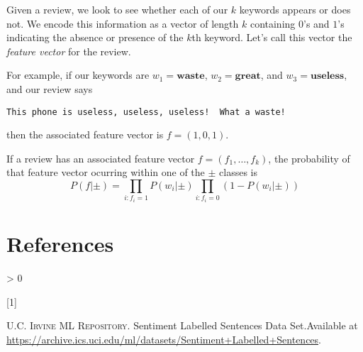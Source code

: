 \documentclass[
]{article}
\newlength{\cslhangindent}
\newlength{\csllabelwidth}
\newenvironment{CSLReferences}[3] %
 {%
  \setlength{\parindent}{0pt}
  \ifodd #1 \everypar{\setlength{\hangindent}{\cslhangindent}}\ignorespaces\fi
  \ifnum #2 > 0
  \setlength{\parskip}{#3\baselineskip}
  \fi
 }%
 {}
\newcommand{\CSLLeftMargin}[1]{\parbox[t]{\maxof{\widthof{#1}}{\csllabelwidth}}{#1}}
\newcommand{\CSLRightInline}[1]{\parbox[t]{\linewidth}{#1}}
\begin{document}
Given a review, we look to see whether each of our \(k\) keywords
appears or does not. We encode this information as a vector of length
\(k\) containing \(0\)'s and \(1\)'s indicating the absence or presence
of the \(k\)th keyword. Let's call this vector the \emph{feature vector}
for the review.

For example, if our keywords are \(w_1=\mathbf{waste}\),
\(w_2=\mathbf{great}\), and \(w_3=\mathbf{useless}\), and our review
says

\begin{lstlisting}
This phone is useless, useless, useless!  What a waste!
\end{lstlisting}

then the associated feature vector is \(f=(1,0,1)\).

If a review has an associated feature vector \(f=(f_1,\ldots, f_k)\),
the probability of that feature vector ocurring within one of the
\(\pm\) classes is \[
P(f|\pm) = \prod_{i: f_{i}=1} P(w_{i}|\pm)\prod_{i: f_{i}=0}(1-P(w_{i}|\pm))
\]

\hypertarget{bibliography}{%
\section*{References}\label{bibliography}}

\hypertarget{refs}{}
\begin{CSLReferences}{0}{0}
\leavevmode\hypertarget{ref-sentences}{}%
\CSLLeftMargin{{[}1{]} }
\CSLRightInline{\textsc{U.C. Irvine ML Repository}. {Sentiment Labelled
Sentences Data Set}.Available at
\url{https://archive.ics.uci.edu/ml/datasets/Sentiment+Labelled+Sentences}.}

\end{CSLReferences}
\end{document}
